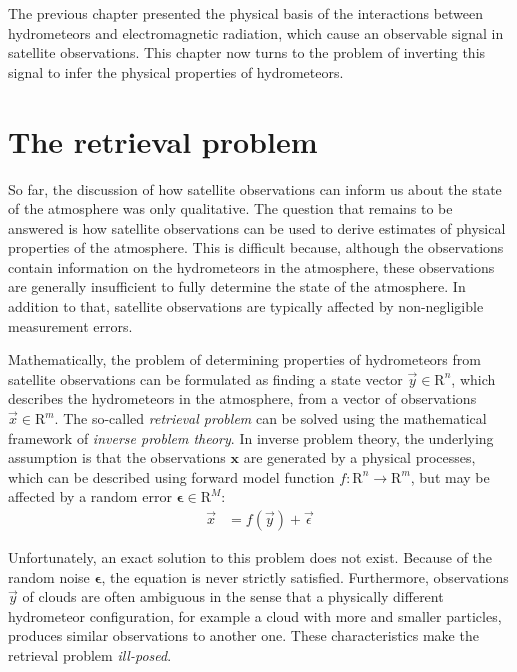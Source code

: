
The previous chapter presented the physical basis of the interactions between
hydrometeors and electromagnetic radiation, which cause an observable signal in
satellite observations. This chapter now turns to the problem of inverting this
signal to infer the physical properties of hydrometeors.


\section{The retrieval problem}
\label{sec:machine_learning:retrieval_problem}

So far, the discussion of how satellite observations can inform us about the
state of the atmosphere was only qualitative. The question that remains to be
answered is how satellite observations can be used to derive estimates of
physical properties of the atmosphere. This is difficult because, although the
observations contain information on the hydrometeors in the atmosphere, these
observations are generally insufficient to fully determine the state of the
atmosphere. In addition to that, satellite observations are typically affected
by non-negligible measurement errors.

Mathematically, the problem of determining properties of hydrometeors from
satellite observations can be formulated as finding a state vector
$\vec{y} \in \mathrm{R}^{n}$, which describes the hydrometeors in the
atmosphere, from a vector of observations $\vec{x} \in \mathrm{R}^{m}$. The
so-called \textit{retrieval problem} can be solved using the mathematical
framework of
\textit{inverse problem theory}. In inverse problem theory, the underlying
assumption is that the observations $\mathbf{x}$ are generated by a physical
processes, which can be described using forward model function
$f: \mathrm{R}^n \rightarrow \mathrm{R}^m$, but may be affected by a random
error $\mathbf{\epsilon} \in \mathrm{R}^M$:
\begin{align}\label{eq:inverse_problem}
  \vec{x} &= f(\vec{y}) + \vec{\epsilon}
\end{align}

Unfortunately, an exact solution to this problem does not exist. Because of the
random noise $\mathbf{\epsilon}$, the equation is never strictly satisfied.
Furthermore, observations $\vec{y}$ of clouds are often ambiguous in the sense
that a physically different hydrometeor configuration, for example a cloud with
more and smaller particles, produces similar observations to another one. These
characteristics make the retrieval problem \textit{ill-posed}.

